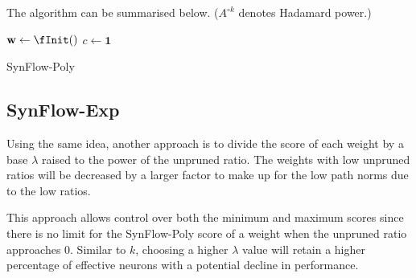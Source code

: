The algorithm can be summarised below. ($A^{\circ k}$ denotes Hadamard power.)

\begin{algorithm}[!h]
\AlgoFontSize
\DontPrintSemicolon


\BlankLine
$\textbf{w} \gets \fInit()$\;
$c \gets \mathbf{1}$ 
\caption{SynFlow-Poly}
\label{SynFlow-Poly:algo}
\end{algorithm}

\subsection{SynFlow-Exp}
Using the same idea, another approach is to divide the score of each weight by a base $\lambda$ raised to the power of the unpruned ratio. The weights with low unpruned ratios will be decreased by a larger factor to make up for the low path norms due to the low ratios. 

This approach allows control over both the minimum and maximum scores since there is no limit for the SynFlow-Poly score of a weight when the unpruned ratio approaches 0. Similar to $k$, choosing a higher $\lambda$ value will retain a higher percentage of effective neurons with a potential decline in performance.

